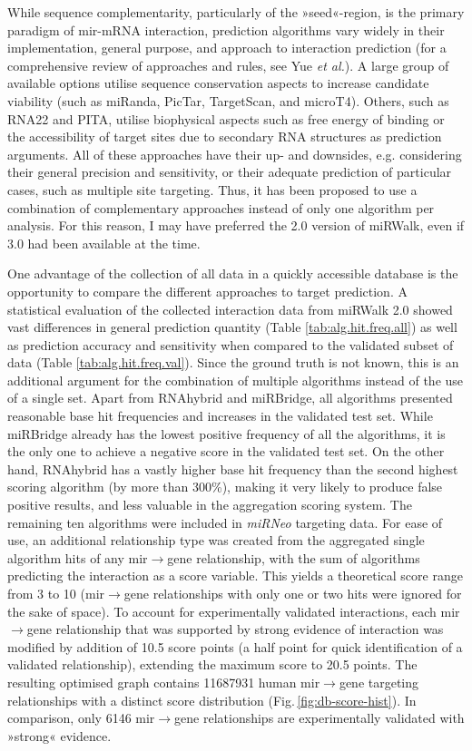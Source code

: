 While sequence complementarity, particularly of the »seed«-region, is the primary paradigm of \ac{mir}-mRNA interaction, prediction algorithms vary widely in their implementation, general purpose, and approach to interaction prediction (for a comprehensive review of approaches and rules, see Yue \emph{et al.}\cite{Yue2009}). A large group of available options utilise sequence conservation aspects to increase candidate viability (such as miRanda, PicTar, TargetScan, and microT4). Others, such as RNA22 and PITA, utilise biophysical aspects such as free energy of binding or the accessibility of target sites due to secondary RNA structures as prediction arguments. All of these approaches have their up- and downsides, e.g. considering their general precision and sensitivity, or their adequate prediction of particular cases, such as multiple site targeting. Thus, it has been proposed to use a combination of complementary approaches instead of only one algorithm per analysis.\cite{Witkos2011} For this reason, I may have preferred the 2.0 version of miRWalk, even if 3.0 had been available at the time.

One advantage of the collection of all data in a quickly accessible database is the opportunity to compare the different approaches to target prediction. A statistical evaluation of the collected interaction data from miRWalk 2.0 showed vast differences in general prediction quantity (Table \ref{tab:alg.hit.freq.all}) as well as prediction accuracy and sensitivity when compared to the validated subset of data (Table \ref{tab:alg.hit.freq.val}). Since the ground truth is not known, this is an additional argument for the combination of multiple algorithms instead of the use of a single set. Apart from RNAhybrid and miRBridge, all algorithms presented reasonable base hit frequencies and increases in the validated test set. While miRBridge already has the lowest positive frequency of all the algorithms, it is the only one to achieve a negative score in the validated test set. On the other hand, RNAhybrid has a vastly higher base hit frequency than the second highest scoring algorithm (by more than \num{300}\%), making it very likely to produce false positive results, and less valuable in the aggregation scoring system. The remaining ten algorithms were included in \textit{miRNeo} targeting data. For ease of use, an additional relationship type was created from the aggregated single algorithm hits of any \ac{mir}$\to$gene relationship, with the sum of algorithms predicting the interaction as a score variable. This yields a theoretical score range from \num{3} to \num{10} (\ac{mir}$\to$gene relationships with only one or two hits were ignored for the sake of space). To account for experimentally validated interactions, each \ac{mir}$\to$gene relationship that was supported by strong evidence of interaction was modified by addition of \num{10.5} score points (a half point for quick identification of a validated relationship), extending the maximum score to \num{20.5} points. The resulting optimised graph contains \num{11687931} human \ac{mir}$\to$gene targeting relationships with a distinct score distribution (Fig.\,\ref{fig:db-score-hist}). In comparison, only 6146 \ac{mir}$\to$gene relationships are experimentally validated with »strong« evidence.

